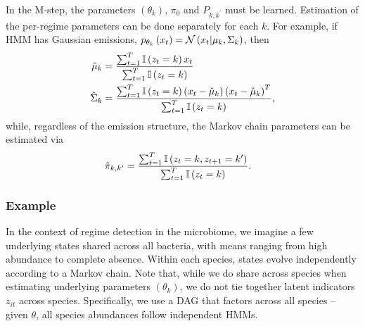 \documentclass[14pt]{extarticle}
\begin{document}
In the M-step, the parameters $\left(\theta_{k}\right)$, $\pi_0$ and
$P_{k, k^{\prime}}$ must be learned. Estimation of the per-regime parameters
can be done separately for each $k$. For example, if HMM has Gaussian emissions,
$p_{\theta_{k}}\left(x_{t}\right) = \mathcal{N}\left(x_{t} \vert \mu_{k},
\Sigma_{k}\right)$, then
\begin{align*}
  \hat{\mu}_{k} &= \frac{\sum_{t = 1}^{T} \mathbb{I}\left({z_{t} = k}\right)x_{t}}{\sum_{t = 1}^{T}\mathbb{I}\left({z_{t} = k}\right)} \\
  \hat{\Sigma}_{k} &= \frac{\sum_{t = 1}^{T} \mathbb{I}\left({z_{t} = k}\right)\left(x_{t} - \hat{\mu}_{k}\right)\left(x_{t} - \hat{\mu}_{k}\right)^{T}}
      {\sum_{t = 1}^{T} \mathbb{I}\left({z_{t} = k}\right)},
\end{align*}
while, regardless of the emission structure, the Markov chain parameters can be
estimated via
\begin{align*}
  \hat{\pi}_{k, k^{\prime}} &= \frac{\sum_{t = 1}^{T} \mathbb{I}\left({z_{t} = k, z_{t + 1} = k^{\prime}}\right)}{\sum_{t = 1}^{T} \mathbb{I}\left({z_{t} = k}\right)}.
\end{align*}

\subsubsection{Example}
\label{subsubsec:hmm_example}

In the context of regime detection in the microbiome, we imagine a few
underlying states shared across all bacteria, with means ranging from high abundance to
complete absence. Within each species, states evolve independently according to
a Markov chain. Note that, while we do share across species when estimating
underlying parameters $\left(\theta_{k}\right)$, we do not tie together latent
indicators $z_{it}$ across species. Specifically, we use a DAG that factors
across all species -- given $\theta$, all species abundances follow independent
HMMs.
\end{document}
